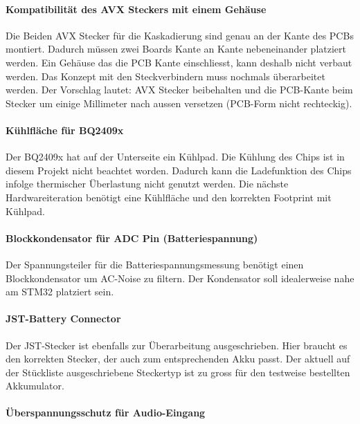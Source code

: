 \paragraph{Kompatibilität des AVX Steckers mit einem Gehäuse}

Die Beiden AVX Stecker für die Kaskadierung sind genau an der Kante des PCBs montiert. Dadurch müssen zwei Boards Kante an Kante nebeneinander platziert werden.
Ein Gehäuse das die PCB Kante einschliesst, kann deshalb nicht verbaut werden.
Das Konzept mit den Steckverbindern muss nochmals überarbeitet werden.
Der Vorschlag lautet: AVX Stecker beibehalten und die PCB-Kante beim Stecker um einige Millimeter nach aussen versetzen (PCB-Form nicht rechteckig).

\paragraph{Kühlfläche für BQ2409x}

Der BQ2409x hat auf der Unterseite ein Kühlpad. Die Kühlung des Chips ist in diesem Projekt nicht beachtet worden. Dadurch kann die Ladefunktion des Chips infolge thermischer Überlastung nicht genutzt werden. Die nächste Hardwareiteration benötigt eine Kühlfläche und den korrekten Footprint mit Kühlpad.

\paragraph{Blockkondensator für ADC Pin (Batteriespannung)}

Der Spannungsteiler für die Batteriespannungsmessung benötigt einen Blockkondensator um AC-Noise zu filtern. Der Kondensator soll idealerweise nahe am STM32 platziert sein.

\paragraph{JST-Battery Connector}

Der JST-Stecker ist ebenfalls zur Überarbeitung ausgeschrieben. Hier braucht es den korrekten Stecker, der auch zum entsprechenden Akku passt. 
Der aktuell auf der Stückliste ausgeschriebene Steckertyp ist zu gross für den testweise bestellten Akkumulator.


\paragraph{Überspannungsschutz für Audio-Eingang}

